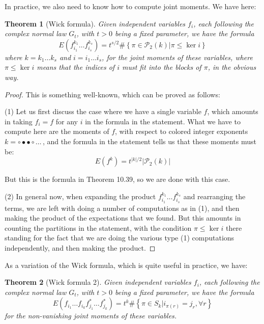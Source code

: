 \documentclass[12pt]{amsbook}
\newtheorem{theorem}{Theorem}[chapter]
\begin{document}
In practice, we also need to know how to compute joint moments. We have here:


\begin{theorem}[Wick formula]
Given independent variables $f_i$, each following the complex normal law $G_t$, with $t>0$ being a fixed parameter, we have the formula
$$E\left(f_{i_1}^{k_1}\ldots f_{i_s}^{k_s}\right)=t^{s/2}\#\left\{\pi\in\mathcal P_2(k)\Big|\pi\leq\ker i\right\}$$
where $k=k_1\ldots k_s$ and $i=i_1\ldots i_s$, for the joint moments of these variables, where $\pi\leq\ker i$ means that the indices of $i$ must fit into the blocks of $\pi$, in the obvious way.
\end{theorem}

\begin{proof}
This is something well-known, which can be proved as follows:

\medskip

(1) Let us first discuss the case where we have a single variable $f$, which amounts in taking $f_i=f$ for any $i$ in the formula in the statement. What we have to compute here are the moments of $f$, with respect to colored integer exponents $k=\circ\bullet\bullet\circ\ldots\,$, and the formula in the statement tells us that these moments must be:
$$E(f^k)=t^{|k|/2}|\mathcal P_2(k)|$$

But this is the formula in Theorem 10.39, so we are done with this case.

\medskip

(2) In general now, when expanding the product $f_{i_1}^{k_1}\ldots f_{i_s}^{k_s}$ and rearranging the terms, we are left with doing a number of computations as in (1), and then making the product of the expectations that we found. But this amounts in counting the partitions in the statement, with the condition $\pi\leq\ker i$ there standing for the fact that we are doing the various type (1) computations independently, and then making the product.
\end{proof}

As a variation of the Wick formula, which is quite useful in practice, we have:


\begin{theorem}[Wick formula 2]
Given independent variables $f_i$, each following the complex normal law $G_t$, with $t>0$ being a fixed parameter, we have the formula
$$E\left(f_{i_1}\ldots f_{i_k}f_{j_1}^*\ldots f_{j_k}^*\right)=t^k\#\left\{\pi\in S_k\Big|i_{\pi(r)}=j_r,\forall r\right\}$$
for the non-vanishing joint moments of these variables.
\end{theorem}
\end{document}

